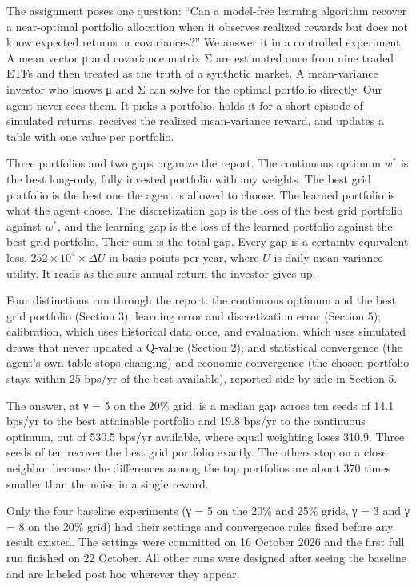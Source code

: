 \documentclass[
  11pt]{article}
\begin{document}
The assignment poses one question: ``Can a model-free learning algorithm
recover a near-optimal portfolio allocation when it observes realized
rewards but does not know expected returns or covariances?'' We answer
it in a controlled experiment. A mean vector μ and covariance matrix Σ
are estimated once from nine traded ETFs and then treated as the truth
of a synthetic market. A mean-variance investor who knows μ and Σ can
solve for the optimal portfolio directly. Our agent never sees them. It
picks a portfolio, holds it for a short episode of simulated returns,
receives the realized mean-variance reward, and updates a table with one
value per portfolio.

Three portfolios and two gaps organize the report. The continuous
optimum \(w^*\) is the best long-only, fully invested portfolio with any
weights. The best grid portfolio is the best one the agent is allowed to
choose. The learned portfolio is what the agent chose. The
discretization gap is the loss of the best grid portfolio against
\(w^*\), and the learning gap is the loss of the learned portfolio
against the best grid portfolio. Their sum is the total gap. Every gap
is a certainty-equivalent loss, \(252 \times 10^4 \times \Delta U\) in
basis points per year, where \(U\) is daily mean-variance utility. It
reads as the sure annual return the investor gives up.

Four distinctions run through the report: the continuous optimum and the
best grid portfolio (Section 3); learning error and discretization error
(Section 5); calibration, which uses historical data once, and
evaluation, which uses simulated draws that never updated a Q-value
(Section 2); and statistical convergence (the agent's own table stops
changing) and economic convergence (the chosen portfolio stays within 25
bps/yr of the best available), reported side by side in Section 5.

The answer, at γ = 5 on the 20\% grid, is a median gap across ten seeds
of 14.1 bps/yr to the best attainable portfolio and 19.8 bps/yr to the
continuous optimum, out of 530.5 bps/yr available, where equal weighting
loses 310.9. Three seeds of ten recover the best grid portfolio exactly.
The others stop on a close neighbor because the differences among the
top portfolios are about 370 times smaller than the noise in a single
reward.

Only the four baseline experiments (γ = 5 on the 20\% and 25\% grids, γ
= 3 and γ = 8 on the 20\% grid) had their settings and convergence rules
fixed before any result existed. The settings were committed on 16
October 2026 and the first full run finished on 22 October. All other
runs were designed after seeing the baseline and are labeled post hoc
wherever they appear.
\end{document}
